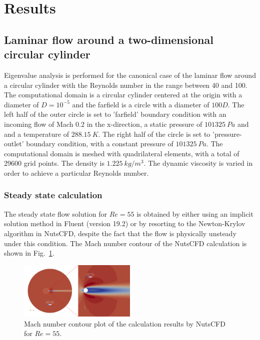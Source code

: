 \documentclass[journal,final]{new-aiaa}
\begin{document}
\section{Results}
\label{label:results}

\subsection{Laminar flow around a two-dimensional circular cylinder}
Eigenvalue analysis is performed for the canonical case of the
laminar flow around a circular cylinder with the Reynolds number in
the range between 40 and 100. The computational domain is a
circular cylinder centered at the origin with a diameter of $D=10^{-5}$
and the farfield is a circle with a diameter of $100D$. The left half of
the outer circle is set to 'farfield' boundary condition with an incoming
flow of Mach 0.2 in the x-direction, a static pressure of $101325~Pa$ and
and a temperature of $288.15~K$.
The right half of the circle is set to 'pressure-outlet' boundary condition,
with a constant pressure of $101325~Pa$.
The computational domain is meshed with quadrilateral elements,
with a total of 29600 grid points. The density is $1.225~kg/m^3$.
The dynamic viscosity is varied in order to achieve a particular Reynolds number.

\subsubsection{Steady state calculation}
The steady state flow solution for $Re=55$ is obtained by either using an implicit solution method in
Fluent (version 19.2) or by resorting to the Newton-Krylov algorithm in NutsCFD,
despite the fact that the flow is physically unsteady under this condition. The
Mach number contour of the NutsCFD calculation is shown in Fig.~\ref{fig:cyl-re55}.

\begin{figure}[htb]
	\centering   
	\includegraphics[width=0.5\textwidth]{pic/cylinder-std.png}
	\caption{Mach number contour plot of the calculation results by NutsCFD for $Re=55$.}
	\label{fig:cyl-re55}
\end{figure}
\end{document}
